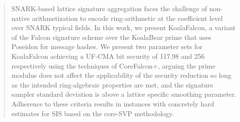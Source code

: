 \begin{abstract}

SNARK-based lattice signature aggregation faces the challenge of non-native arithmetization 
to encode ring-arithmetic at the coefficient level over SNARK typical fields. In this work, we 
present KoalaFalcon, 
a variant of the Falcon signature scheme over the KoalaBear prime that uses Poseidon for 
message hashes. We present two parameter sets for KoalaFalcon achieving a UF-CMA bit security of 
117.98 and 256 respectively using the techniques of CoreFalcon+, arguing
the prime modulus does not affect the applicability of the security reduction
so long as the intended ring-algebraic properties are met, and the signature sampler 
standard deviation is above a lattice specific smoothing parameter. Adherence to these 
criteria results in instances with concretely hard estimates for SIS based on the core-SVP 
methodology. 

\end{abstract}

